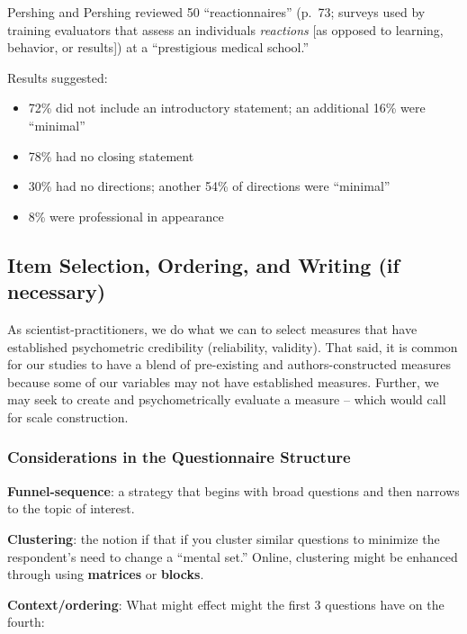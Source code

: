 \documentclass[
  english,
]{book}
\providecommand{\tightlist}{%
  \setlength{\itemsep}{0pt}\setlength{\parskip}{0pt}}
\begin{document}
Pershing and Pershing \citeyearpar{pershing_ineffective_2001} reviewed 50 ``reactionnaires'' (p.~73; surveys used by training evaluators that assess an individuals \emph{reactions} {[}as opposed to learning, behavior, or results{]}) at a ``prestigious medical school.''

Results suggested:

\begin{itemize}
\tightlist
\item
  72\% did not include an introductory statement; an additional 16\% were ``minimal''
\item
  78\% had no closing statement
\item
  30\% had no directions; another 54\% of directions were ``minimal''
\item
  8\% were professional in appearance
\end{itemize}

\hypertarget{item-selection-ordering-and-writing-if-necessary}{%
\subsection{Item Selection, Ordering, and Writing (if necessary)}\label{item-selection-ordering-and-writing-if-necessary}}

As scientist-practitioners, we do what we can to select measures that have established psychometric credibility (reliability, validity). That said, it is common for our studies to have a blend of pre-existing and authors-constructed measures because some of our variables may not have established measures. Further, we may seek to create and psychometrically evaluate a measure -- which would call for scale construction.

\hypertarget{considerations-in-the-questionnaire-structure}{%
\subsubsection{Considerations in the Questionnaire Structure}\label{considerations-in-the-questionnaire-structure}}

\textbf{Funnel-sequence}: a strategy that begins with broad questions and then narrows to the topic of interest.

\textbf{Clustering}: the notion if that if you cluster similar questions to minimize the respondent's need to change a ``mental set.'' Online, clustering might be enhanced through using \textbf{matrices} or \textbf{blocks}.

\textbf{Context/ordering}: What might effect might the first 3 questions have on the fourth:
\end{document}
